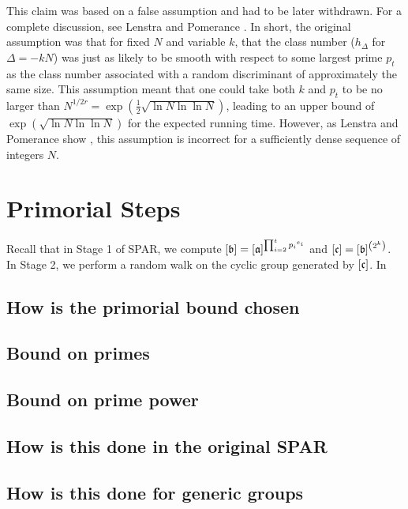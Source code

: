 \documentclass{ucalgthes1}
\theoremstyle{definition}
\begin{document}
This claim was based on a false assumption and had to be later withdrawn.  For a complete discussion, see Lenstra and Pomerance \cite[\S 11]{Lenstra1992}.  In short, the original assumption was that for fixed $N$ and variable $k$, that the class number ($h_\Delta$ for $\Delta = -kN$) was just as likely to be smooth with respect to some largest prime $p_t$ as the class number associated with a random discriminant of approximately the same size.  This assumption meant that one could take both $k$ and $p_t$ to be no larger than $N^{1/2r} = \exp\left(\frac{1}{2}\sqrt{\ln N \ln \ln N}\right)$, leading to an upper bound of $\exp\left(\sqrt{\ln N \ln \ln N}\right)$ for the expected running time.  However, as Lenstra and Pomerance show \cite[\S 11]{Lenstra1992}, this assumption is incorrect for a sufficiently dense sequence of integers $N$.



\section{Primorial Steps}
\label{sec:primorial}

Recall that in Stage 1 of SPAR, we compute $[\mathfrak b] = [\mathfrak a]^{\prod_{i=2}^t {p_i}^{e_i}}$ and $[\mathfrak c] = [\mathfrak b]^{\left(2^k\right)}$.  In Stage 2, we perform a random walk on the cyclic group generated by $[\mathfrak c]$.  In 

\subsection{How is the primorial bound chosen}

\subsection{Bound on primes}

\subsection{Bound on prime power}

\subsection{How is this done in the original SPAR}

\subsection{How is this done for generic groups}
\end{document}
